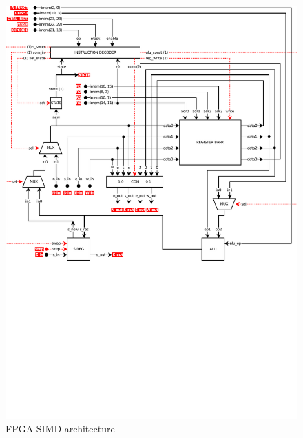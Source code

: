 \begin{figure}[h]
  \centering
  \includegraphics[width=\linewidth,clip,trim=0 11cm 0 0]
                  {fig/fpga/fpga-simd-arch.pdf}
  \caption{FPGA SIMD architecture}
  \label{fig:fpga-simd-arch}
\end{figure}
